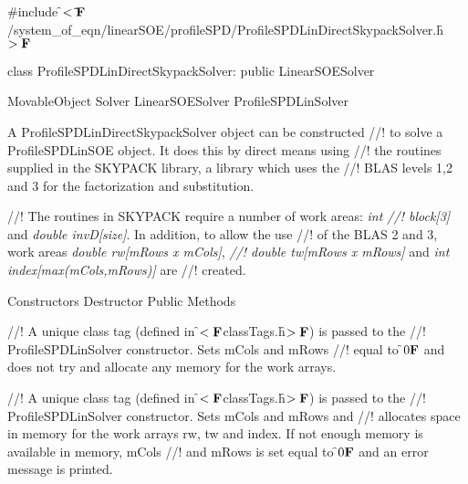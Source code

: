 
\indent \#include \f$<\tilde{ }{\bf F}$/system\_of\_eqn/linearSOE/profileSPD/ProfileSPDLinDirectSkypackSolver.h\f$>{\bf F}$

\indent class ProfileSPDLinDirectSkypackSolver: public LinearSOESolver

\indent MovableObject
\indent\indent  Solver
\indent\indent\indent LinearSOESolver
\indent\indent\indent\indent ProfileSPDLinSolver
\indent\indent\indent\indent{}

\indent A ProfileSPDLinDirectSkypackSolver object can be constructed
//! to solve a ProfileSPDLinSOE object. It does this by direct means using
//! the routines supplied in the SKYPACK library, a library which uses the
//! BLAS levels 1,2 and 3 for the factorization and substitution. 

//! The routines in SKYPACK require a number of work areas: {\em int
//! block[3]} and {\em double invD[size]}. In addition, to allow the use
//! of the BLAS 2 and 3, work areas {\em double rw[mRows x mCols]}, {\em
//! double tw[mRows x mRows]} and {\em int index[max(mCols,mRows)]} are 
//! created.


\indent\indent Constructors
\indent{} 
\indent{}
\indent\indent Destructor
\indent{}
\indent\indent Public Methods
\indent{}
\indent{}
\indent{} 
\indent{} 


//! A unique class tag (defined in \f$<{\bf F}$classTags.h\f$>{\bf F}$) is passed to the
//! ProfileSPDLinSolver constructor. Sets \p mCols and \p mRows
//! equal to \f$0{\bf F}$ and does not try and allocate any memory for the work arrays.

//! A unique class tag (defined in \f$<{\bf F}$classTags.h\f$>{\bf F}$) is passed to the
//! ProfileSPDLinSolver constructor. Sets \p mCols and \p mRows and
//! allocates space in memory for the work arrays \p rw, \p tw and
\p index. If not enough memory is available in memory, \p mCols
//! and \p mRows is set equal to \f$0{\bf F}$ and an error message is printed.

